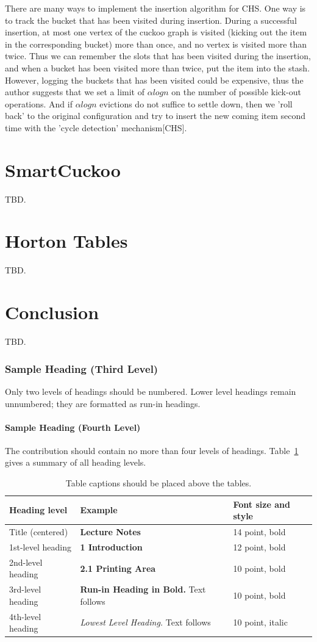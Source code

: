 \documentclass[runningheads]{llncs}
\begin{document}
There are many ways to implement the insertion algorithm for CHS. One way is to track the bucket that has been visited during insertion. During a successful insertion, at most one vertex of the cuckoo graph is visited (kicking out the item in the corresponding bucket) more than once, and no vertex is visited more than twice. Thus we can remember the slots that has been visited during the insertion, and when a bucket has been visited more than twice, put the item into the stash. However, logging the buckets that has been visited could be expensive, thus the author suggests that we set a limit of $\alpha logn$ on the number of possible kick-out operations. And if $\alpha logn$ evictions do not suffice to settle down, then we 'roll back' to the original configuration and try to insert the new coming item second time with the 'cycle detection' mechanism[CHS].


\section{SmartCuckoo}
\label{sec:smart}
TBD.
\section{Horton Tables}
\label{sec:horton}
TBD.
\section{Conclusion}
\label{sec:conclude}
TBD.

\subsubsection{Sample Heading (Third Level)} Only two levels of
headings should be numbered. Lower level headings remain unnumbered;
they are formatted as run-in headings.

\paragraph{Sample Heading (Fourth Level)}
The contribution should contain no more than four levels of
headings. Table~\ref{tab1} gives a summary of all heading levels.

\begin{table}
\caption{Table captions should be placed above the
tables.}\label{tab1}
\begin{tabular}{|l|l|l|}
\hline
Heading level &  Example & Font size and style\\
\hline
Title (centered) &  {\Large\bfseries Lecture Notes} & 14 point, bold\\
1st-level heading &  {\large\bfseries 1 Introduction} & 12 point, bold\\
2nd-level heading & {\bfseries 2.1 Printing Area} & 10 point, bold\\
3rd-level heading & {\bfseries Run-in Heading in Bold.} Text follows & 10 point, bold\\
4th-level heading & {\itshape Lowest Level Heading.} Text follows & 10 point, italic\\
\hline
\end{tabular}
\end{table}
\end{document}
